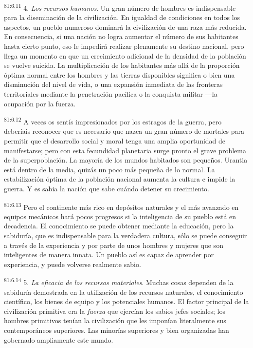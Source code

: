 \par
\textsuperscript{81:6.11} 4. \textit{Los recursos humanos}. Un gran número de hombres es indispensable para la diseminación de la civilización. En igualdad de condiciones en todos los aspectos, un pueblo numeroso dominará la civilización de una raza más reducida. En consecuencia, si una nación no logra aumentar el número de sus habitantes hasta cierto punto, eso le impedirá realizar plenamente su destino nacional, pero llega un momento en que un crecimiento adicional de la densidad de la población se vuelve suicida. La multiplicación de los habitantes más allá de la proporción óptima normal entre los hombres y las tierras disponibles significa o bien una disminución del nivel de vida, o una expansión inmediata de las fronteras territoriales mediante la penetración pacífica o la conquista militar ---la ocupación por la fuerza.

\par
\textsuperscript{81:6.12} A veces os sentís impresionados por los estragos de la guerra, pero deberíais reconocer que es necesario que nazca un gran número de mortales para permitir que el desarrollo social y moral tenga una amplia oportunidad de manifestarse; pero con esta fecundidad planetaria surge pronto el grave problema de la superpoblación. La mayoría de los mundos habitados son pequeños. Urantia está dentro de la media, quizás un poco más pequeña de lo normal. La estabilización óptima de la población nacional aumenta la cultura e impide la guerra. Y es sabia la nación que sabe cuándo detener su crecimiento.

\par
\textsuperscript{81:6.13} Pero el continente más rico en depósitos naturales y el más avanzado en equipos mecánicos hará pocos progresos si la inteligencia de su pueblo está en decadencia. El conocimiento se puede obtener mediante la educación, pero la sabiduría, que es indispensable para la verdadera cultura, sólo se puede conseguir a través de la experiencia y por parte de unos hombres y mujeres que son inteligentes de manera innata. Un pueblo así es capaz de aprender por experiencia, y puede volverse realmente sabio.

\par
\textsuperscript{81:6.14} 5. \textit{La eficacia de los recursos materiales}. Muchas cosas dependen de la sabiduría demostrada en la utilización de los recursos naturales, el conocimiento científico, los bienes de equipo y los potenciales humanos. El factor principal de la civilización primitiva era la \textit{fuerza} que ejercían los sabios jefes sociales; los hombres primitivos tenían la civilización que les imponían literalmente sus contemporáneos superiores. Las minorías superiores y bien organizadas han gobernado ampliamente este mundo.

